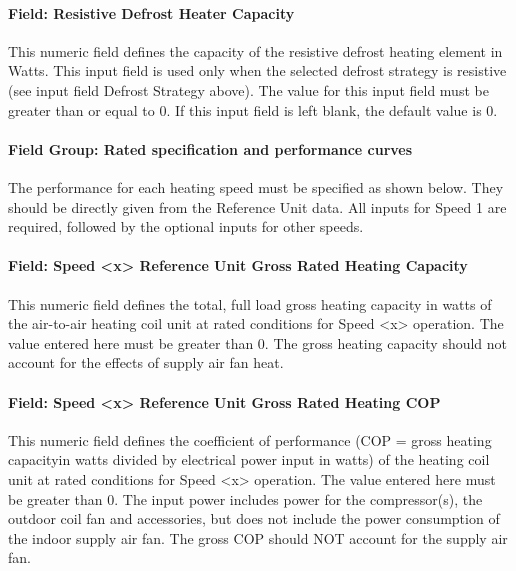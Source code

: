 \paragraph{Field: Resistive Defrost Heater Capacity}\label{field-resistive-defrost-heater-capacity-2}

This numeric field defines the capacity of the resistive defrost heating element in Watts. This input field is used only when the selected defrost strategy is resistive (see input field Defrost Strategy above). The value for this input field must be greater than or equal to 0. If this input field is left blank, the default value is 0.

\paragraph{Field Group: Rated specification and performance curves}\label{field-group-rated-specification-and-performance-curves}

The performance for each heating speed must be specified as shown below. They should be directly given from the Reference Unit data. All inputs for Speed 1 are required, followed by the optional inputs for other speeds.

\paragraph{Field: Speed \textless{}x\textgreater{} Reference Unit Gross Rated Heating Capacity}\label{field-speed-x-reference-unit-gross-rated-heating-capacity}

This numeric field defines the total, full load gross heating capacity in watts of the air-to-air heating coil unit at rated conditions for Speed \textless{}x\textgreater{} operation. The value entered here must be greater than 0. The gross heating capacity should not account for the effects of supply air fan heat.

\paragraph{Field: Speed \textless{}x\textgreater{} Reference Unit Gross Rated Heating COP}\label{field-speed-x-reference-unit-gross-rated-heating-cop}

This numeric field defines the coefficient of performance (COP = gross heating capacityin watts divided by electrical power input in watts) of the heating coil unit at rated conditions for Speed \textless{}x\textgreater{} operation. The value entered here must be greater than 0. The input power includes power for the compressor(s), the outdoor coil fan and accessories, but does not include the power consumption of the indoor supply air fan. The gross COP should NOT account for the supply air fan.

